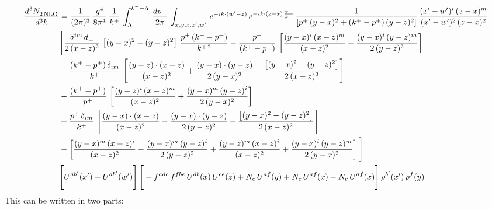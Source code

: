 \documentclass[9pt]{article}
\numberwithin{equation}{section}
\begin{document}
\begin{align}
    \frac{d^{3}N_{2\,\rm NLO}^{\rm}}{d^{3}k}  & =  \frac{1}{(2\pi)^{3}}\, \frac{g^{4}}{8\pi^{4}}\,\frac{1}{k^{+}}\,\int_{\Lambda}^{k^{+}-\Lambda}\, \frac{dp^{+}}{2\pi} \, \int_{x,y,z,x',w'}\,e^{-ik\cdot(w'-z)}\,e^{-ik\cdot (z-x)\,\frac{p^{+}}{k^{+}}}\,\frac{1}{\left[p^{+}\,(y-x)^{2}+(k^{+}-p^{+})\,(y-z)^{2}\right]}\, \frac{(x'-w')^{i}\,(z-x)^{m}}{(x'-w')^{2}\,(z-x)^{2}} \notag \\ & \Bigg[\frac{\delta^{im}\,d_{\perp}}{2\,(x-z)^{2}}\,\left[(y-x)^{2}-(y-z)^{2}\right]\,\frac{p^{+}\,(k^{+}-p^{+})}{k^{+\,2}}-\frac{p^{+}}{(k^{+}-p^{+})}\,\left[\frac{(y-x)^{i}\,(x-z)^{m}}{(x-z)^{2}}-\frac{(y-x)^{i}\,(y-z)^{m}}{2\,(y-z)^{2}}\right]\notag \\ & +\frac{(k^{+}-p^{+})\,\delta_{im}}{k^{+}}\,\left[\frac{(y-z)\cdot (x-z)}{(x-z)^{2}}+\frac{(y-x)\cdot (y-z)}{2\,(y-x)^{2}}-\frac{\left[(y-x)^{2}-(y-z)^{2}\right]}{2\,(x-z)^{2}}\right]\notag \\ & -\frac{(k^{+}-p^{+})}{p^{+}}\,\left[\frac{(y-z)^{i}\,(x-z)^{m}}{(x-z)^{2}}+\frac{(y-x)^{m}\,(y-z)^{i}}{2\,(y-x)^{2}}\right]\notag \\ & +\frac{p^{+}\,\delta_{im}}{k^{+}}\,\left[\frac{(y-x)\cdot (x-z)}{(x-z)^{2}}-\frac{(y-x)\cdot (y-z)}{2\,(y-z)^{2}}-\frac{\left[(y-x)^{2}-(y-z)^{2}\right]}{2\,(x-z)^{2}}\right]\notag \\ &-\left[\frac{(y-x)^{m}\,(x-z)^{i}}{(x-z)^{2}}-\frac{(y-x)^{m}\,(y-z)^{i}}{2\,(y-z)^{2}}+\frac{(y-z)^{m}\,(x-z)^{i}}{(x-z)^{2}}+\frac{(y-x)^{i}\,(y-z)^{m}}{2\,(y-x)^{2}}\right]\Bigg]\notag \\ & \Bigg[U^{ab'}(x')-U^{ab'}(w')\Bigg]\,\Bigg[-f^{adc}\,f^{fbe}\,U^{db}(x)\,U^{ce}(z)+N_{c}\,U^{af}(y)+N_{c}\,U^{af}(x) -N_{c}\,U^{af}(x)\Bigg]\,\rho^{b'}(x')\,\rho^{f}(y)
\end{align}
This can be written in two parts: 
\end{document}
